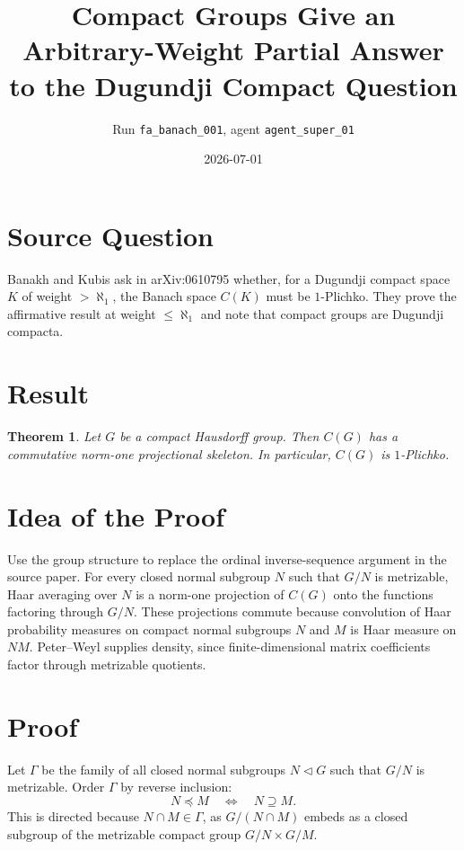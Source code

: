 \documentclass[11pt]{article}
\title{Compact Groups Give an Arbitrary-Weight Partial Answer to the Dugundji Compact Question}
\author{Run \texttt{fa\_banach\_001}, agent \texttt{agent\_super\_01}}
\date{2026-07-01}
\newtheorem{theorem}{Theorem}
\newcommand{\C}{C}
\begin{document}
\maketitle

\section*{Source Question}

Banakh and Kubis ask in arXiv:0610795 whether, for a Dugundji compact space
\(K\) of weight \(>\aleph_1\), the Banach space \(\C(K)\) must be
\(1\)-Plichko.  They prove the affirmative result at weight \(\leq\aleph_1\)
and note that compact groups are Dugundji compacta.

\section*{Result}

\begin{theorem}
Let \(G\) be a compact Hausdorff group.  Then \(\C(G)\) has a commutative
norm-one projectional skeleton.  In particular, \(\C(G)\) is \(1\)-Plichko.
\end{theorem}

\section*{Idea of the Proof}

Use the group structure to replace the ordinal inverse-sequence argument in
the source paper.  For every closed normal subgroup \(N\) such that \(G/N\)
is metrizable, Haar averaging over \(N\) is a norm-one projection of
\(\C(G)\) onto the functions factoring through \(G/N\).  These projections
commute because convolution of Haar probability measures on compact normal
subgroups \(N\) and \(M\) is Haar measure on \(NM\).  Peter--Weyl supplies
density, since finite-dimensional matrix coefficients factor through
metrizable quotients.

\section*{Proof}

Let \(\Gamma\) be the family of all closed normal subgroups \(N\triangleleft G\)
such that \(G/N\) is metrizable.  Order \(\Gamma\) by reverse inclusion:
\[
   N \preceq M \quad\Longleftrightarrow\quad N\supseteq M .
\]
This is directed because \(N\cap M\in\Gamma\), as \(G/(N\cap M)\) embeds as a
closed subgroup of the metrizable compact group \(G/N\times G/M\).
\end{document}
